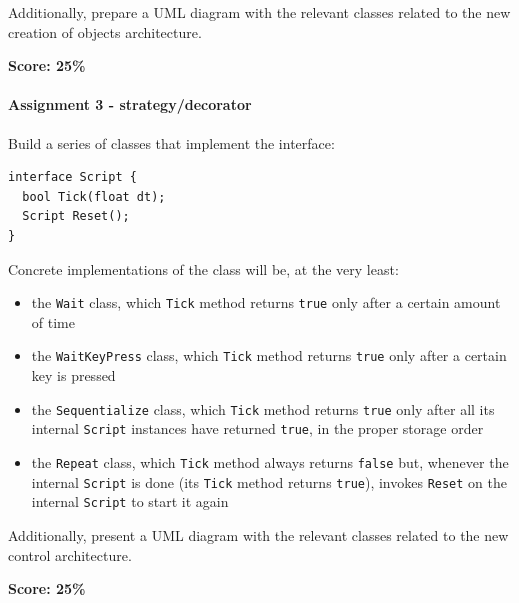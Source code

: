 \documentclass[titlepage,a4paper, 11pt]{article}
\begin{document}
Additionally, prepare a UML diagram with the relevant classes related to the new creation of objects architecture.

\textbf{Score: 25\%}


\paragraph*{Assignment 3 - strategy/decorator}
Build a series of classes that implement the interface:

\begin{lstlisting}
interface Script {
  bool Tick(float dt);
  Script Reset();
}
\end{lstlisting}

Concrete implementations of the class will be, at the very least:
\begin{itemize}
\item the \texttt{Wait} class, which \texttt{Tick} method returns \texttt{true} only after a certain amount of time
\item the \texttt{WaitKeyPress} class, which \texttt{Tick} method returns \texttt{true} only after a certain key is pressed
\item the \texttt{Sequentialize} class, which \texttt{Tick} method returns \texttt{true} only after all its internal \texttt{Script} instances have returned \texttt{true}, in the proper storage order
\item the \texttt{Repeat} class, which \texttt{Tick} method always returns \texttt{false} but, whenever the internal \texttt{Script} is done (its \texttt{Tick} method returns \texttt{true}), invokes \texttt{Reset} on the internal \texttt{Script} to start it again
\end{itemize}

Additionally, present a UML diagram with the relevant classes related to the new control architecture.

\textbf{Score: 25\%}

\newpage
\end{document}
